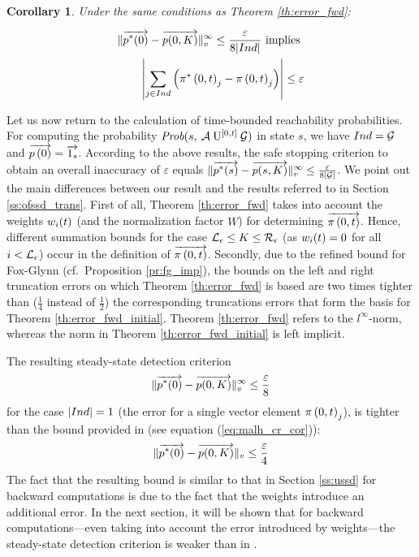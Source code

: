 \documentclass[times, 10pt,twocolumn]{article}
\newtheorem{corollary}[theorem]{Corollary}
\begin{document}
		\begin{corollary}
			Under the same conditions as Theorem \ref{th:error_fwd}:
			{\small
				\begin{fframe}{0.8}{-0.3}
					\begin{eqnarray}
						\lVert  \overrightarrow{p^{*}(0)} - \overrightarrow{p(0,K)}  \rVert_{v}^{\infty} \leq \frac{\varepsilon}{8 |Ind|} \text{ implies } \nonumber \\
						\left| \sum_{j \in Ind} \left( \pi^{*} \left(0, t \right )_{j} - \pi \left(0, t \right )_{j} \right) \right| \leq \varepsilon \label{eq:our_fwd_cor}
					\end{eqnarray}
				\end{fframe}
			}
			\label{cl:error_fwd}
		\end{corollary}
		
		Let us now return to the calculation of time-bounded reachability probabilities. For computing the probability $\mbox{\it Prob}(s, \: \mathcal{A} \: \mathrm{U}^{[0,t]} \: \mathcal{G} )$ in state $s$, we have $Ind = \mathcal{G}$ and $\overrightarrow{p \left( 0 \right)} = \overrightarrow{1_{s} }$.  According to the above results, the safe stopping criterion to obtain an overall inaccuracy of $\varepsilon$ equals  $\lVert  \overrightarrow{p^{*}(s)} - \overrightarrow{p(s,K)}  \rVert_{v}^{\infty} \leq \frac{\varepsilon}{8 | \mathcal{G} |}$. We point out the main differences between our result and the results referred to in Section \ref{ss:ofssd_trans}.
		First of all, Theorem \ref{th:error_fwd} takes into account the weights $w_{i}(t)$ (and the normalization factor $W$) for determining $\overrightarrow{\pi \left(0, t \right )}$.  Hence, different summation bounds for the case $\mathcal{L}_{\epsilon} \leq K \leq \mathcal{R}_{\epsilon}$ (as $w_{i}(t) = 0$ for all $i < \mathcal{L}_{\epsilon}$) occur in the definition of $\overrightarrow{\pi \left(0, t \right )}$.  Secondly, due to the refined bound for Fox-Glynn (cf.\ Proposition \ref{pr:fg_imp}), the bounds on the left and right truncation errors on which Theorem \ref{th:error_fwd} is based are two times tighter than ($\frac{1}{4}$ instead of $\frac{1}{2}$) the corresponding truncations errors that form the basis for Theorem \ref{th:error_fwd_initial}.  Theorem \ref{th:error_fwd} refers to the $l^{\infty}$-norm, whereas the norm in Theorem \ref{th:error_fwd_initial} is left implicit.

		The resulting steady-state detection criterion
			\[
				\lVert  \overrightarrow{p^{*}(0)} - \overrightarrow{p(0,K)}  \rVert_{v}^{\infty} \leq \frac{\varepsilon}{8}
			\]
		for the case $|Ind| = 1$ (the error for a single vector element $\pi \left(0, t \right )_{j}$), is tighter than the bound provided in \cite{MalhotraMT_MR94} (see equation (\ref{eq:malh_cr_cor})):
			\[
				\lVert \overrightarrow{p^{*}(0)} - \overrightarrow{p(0,K)} \rVert_{v} \leq \frac{\varepsilon}{4}
			\]
		The fact that the resulting bound is similar to that in Section \ref{ss:ussd} for backward computations is due to the fact that the weights introduce an additional error. In the next section, it will be shown that for backward computations---even taking into account the error introduced by weights---the steady-state detection criterion is weaker than in \cite{YounesKNP_STTT05} . 
				
\end{document}
